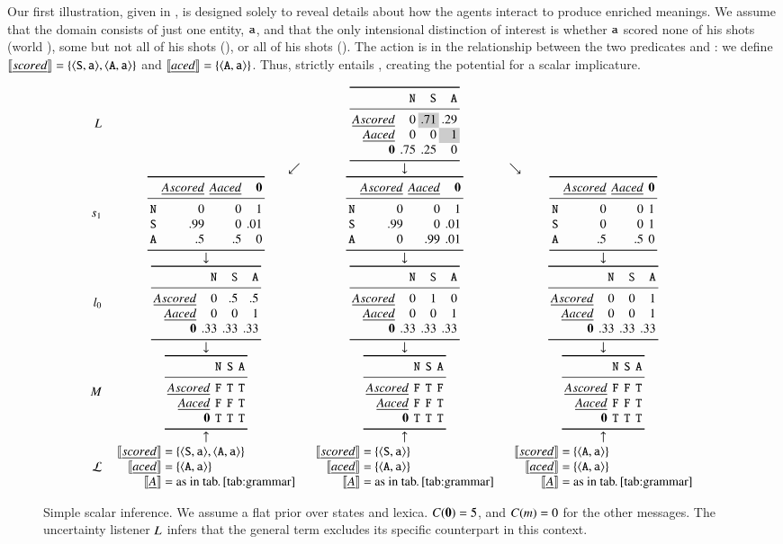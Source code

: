 \documentclass[leqno,12pt]{article}
\begin{document}
Our first illustration, given in , is
designed solely to reveal details about how the agents interact to
produce enriched meanings. We assume that the domain consists of just
one entity, $\texttt{a}$, and that the only intensional distinction of
interest is whether $\texttt{a}$ scored none of his shots (world
), some but not all of his shots (), or all of his
shots (). The action is in the relationship between the two
predicates  and : we define $\llbracket\emph{scored\/}\rrbracket =
\left\{ \langle \texttt{S}, \texttt{a} \rangle, \langle \texttt{A}, \texttt{a} \rangle \right\}$ and
$\llbracket\emph{aced\/}\rrbracket = \left\{ \langle \texttt{A}, \texttt{a} \rangle \right\}$. Thus, 
strictly entails , creating the potential for a scalar
implicature.

\begin{figure}[!ht]
  \[
  \setlength{\arraycolsep}{4pt}
  \begin{array}{r c c c}
    \UncertaintyListener &
    & \genericscalar{0}{\graycell{.71}}{.29}{0}{0}{\graycell{1}}{.75}{.25}{0}
    \\
    & \multicolumn{1}{r}{\swarrow}& \multicolumn{1}{c}{\downarrow}& \multicolumn{1}{l}{\searrow}
    \\
    \speakerOne
    &
    \scalarspeaker{0}{0}{1}{.99}{0}{.01}{.5}{.5}{0}
    &
    \scalarspeaker{0}{0}{1}{.99}{0}{.01}{0}{.99}{.01}
    &
    \scalarspeaker{0}{0}{1}{0}{0}{1}{.5}{.5}{0}
    \\
    & \downarrow & \downarrow & \downarrow
    \\
    \listenerZero
    &
    \genericscalar{0}{.5}{.5}{0}{0}{1}{.33}{.33}{.33}
    &
    \genericscalar{0}{1}{0}{0}{0}{1}{.33}{.33}{.33}
    &
    \genericscalar{0}{0}{1}{0}{0}{1}{.33}{.33}{.33}
    \\
    & \downarrow & \downarrow & \downarrow 
    \\    
    \Messages
    &
    \genericscalar{\False}{\True}{\True}{\False}{\False}{\True}{\True}{\True}{\True}
    &
    \genericscalar{\False}{\True}{\False}{\False}{\False}{\True}{\True}{\True}{\True}
    &
    \genericscalar{\False}{\False}{\True}{\False}{\False}{\True}{\True}{\True}{\True}
    \\
    & \uparrow & \uparrow & \uparrow 
    \\                               
    \Lex
    & 
    \scalarlex{\tuple{\world{S},\playera}, \tuple{\world{A},\playera}}
    & 
    \scalarlex{\tuple{\world{S},\playera}}
    &
    \scalarlex{\tuple{\world{A},\playera}}   
  \end{array}
  \]
  \caption{Simple scalar inference. 
    We assume a flat prior over states and lexica. 
    $C(\mathbf{0}) = 5$, and $C(m) = 0$ for the other messages. 
    The uncertainty listener $L$ infers that the general term 
     excludes its specific counterpart  in this context.}
  \label{fig:simplescalar}
\end{figure}
\end{document}
